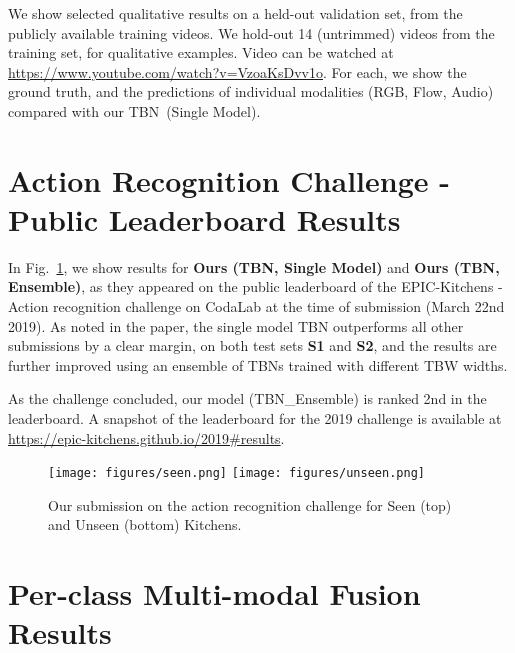 \documentclass[10pt,twocolumn,letterpaper]{article}
\begin{document}
We show selected qualitative results on a held-out validation set, from the publicly available training videos.
We hold-out 14 (untrimmed) videos from the training set, for qualitative examples.  
Video can be watched at \url{https://www.youtube.com/watch?v=VzoaKsDvv1o}. For each, we show the ground truth, and the predictions of individual modalities (RGB, Flow, Audio) compared with our TBN~(Single Model). 


\section{Action Recognition Challenge - Public Leaderboard Results}
\label{sec:leaderboard}

In Fig.~\ref{fig:challengeMar}, we show results for \textbf{Ours (TBN, Single Model)} and \textbf{Ours (TBN, Ensemble)}, as they appeared on the public leaderboard of the EPIC-Kitchens - Action recognition challenge on CodaLab at the time of submission (March 22nd 2019).
As noted in the paper, the single model TBN outperforms all other submissions by a clear margin, on both test sets \textbf{S1} and \textbf{S2}, and the results are further improved using an ensemble of TBNs trained with different TBW widths. 

As the challenge concluded, our model (TBN\_Ensemble) is ranked 2nd in the leaderboard. A snapshot of the leaderboard for the 2019 challenge is available at\\ \url{https://epic-kitchens.github.io/2019#results}. 



 \begin{figure}[t]
 \texttt{[image: figures/seen.png]}
 \texttt{[image: figures/unseen.png]}
 \caption{Our submission on the action recognition challenge for Seen (top) and Unseen (bottom) Kitchens.}
 \label{fig:challengeMar}
 \end{figure}

 
\section{Per-class Multi-modal Fusion Results}
\label{sec:perclass}
 
\end{document}

